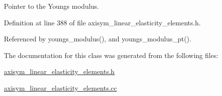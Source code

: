 Pointer to the Young\textquotesingle{}s modulus. 



Definition at line 388 of file axisym\+\_\+linear\+\_\+elasticity\+\_\+elements.\+h.



Referenced by youngs\+\_\+modulus(), and youngs\+\_\+modulus\+\_\+pt().



The documentation for this class was generated from the following files\+:\begin{DoxyCompactItemize}
\item 
\hyperlink{axisym__linear__elasticity__elements_8h}{axisym\+\_\+linear\+\_\+elasticity\+\_\+elements.\+h}\item 
\hyperlink{axisym__linear__elasticity__elements_8cc}{axisym\+\_\+linear\+\_\+elasticity\+\_\+elements.\+cc}\end{DoxyCompactItemize}
